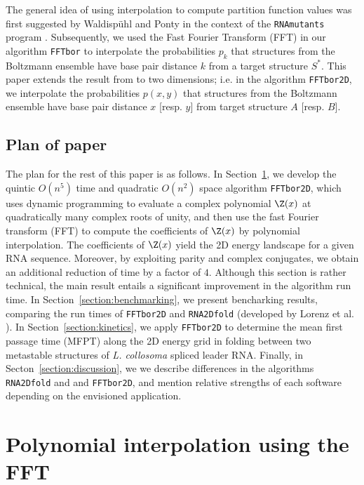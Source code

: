 The general idea of using
interpolation to compute partition function values was first suggested
by Waldisp\"uhl and Ponty in the context of the
{\tt RNAmutants} program \cite{waldispuhlPontyRecomb}. Subsequently,
we used the Fast Fourier Transform (FFT) in our algorithm
{\tt FFTbor} \cite{fftbor}  to interpolate the
probabilities $p_k$ that structures from the Boltzmann
ensemble have base pair distance $k$ from a target structure $S^*$.
This paper extends the result from \cite{fftbor} to two dimensions; i.e.
in the algorithm {\tt FFTbor2D},
we interpolate the probabilities $p(x,y)$ that
structures from the Boltzmann ensemble have base pair distance
$x$ [resp. $y$] from target structure $A$ [resp. $B$].

\subsection{Plan of paper}

The plan for the rest of this paper is as follows. In
Section~\ref{section:approach}, we develop the quintic
$O(n^5)$ time and quadratic $O(n^2)$ space algorithm {\tt FFTbor2D},
which uses dynamic programming to evaluate a complex polynomial
$\Z(x)$ at quadratically many complex roots of unity, and then use the fast
Fourier transform (FFT) to compute the coefficients of $\Z(x)$ by
polynomial interpolation. The coefficients of $\Z(x)$ yield the 2D
energy landscape for a given RNA sequence. Moreover, by exploiting
parity and complex conjugates, we obtain an additional reduction of time
by a factor of $4$. Although this section is rather technical, the
main result entails a significant improvement in the algorithm
run time.
In Section~\ref{section:benchmarking}, we present bencharking results,
comparing the run times of {\tt FFTbor2D} and {\tt RNA2Dfold}
(developed by Lorenz et al.  \cite{hofacker:RNAbor2D}).
In Section~\ref{section:kinetics}, we apply {\tt FFTbor2D} to determine
the mean first passage time (MFPT) along the 2D energy grid in folding
between two metastable structures of {\em L. collosoma} spliced leader
RNA.
Finally, in Secton~\ref{section:discussion}, we we describe
differences in the algorithms {\tt RNA2Dfold} and
and {\tt FFTbor2D}, and mention relative strengths of each software
depending on the envisioned application.

\section{Polynomial interpolation using the FFT}
\label{section:approach}

